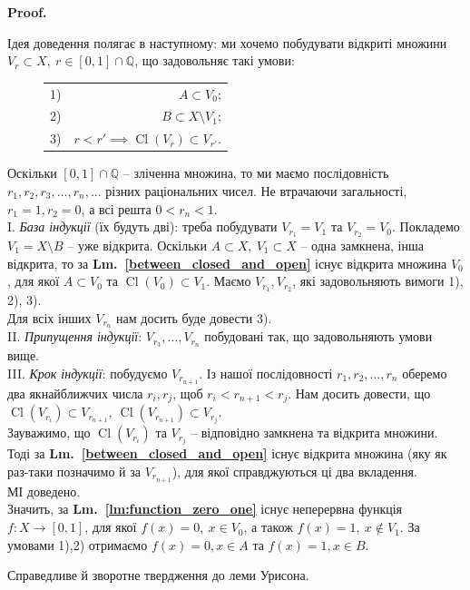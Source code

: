 \documentclass[a4paper, 10pt]{article}
\makeatletter
\theoremstyle{theoremdd}
\newcommand\lmref[1]{\textbf{Lm.~\ref{#1}}}
\DeclareMathOperator{\Cl}{Cl}
\renewenvironment{proof}[1][Proof.\\]{\par
\pushQED{\hfill \qed}%
\normalfont \topsep6\p@\@plus6\p@\relax
\trivlist
\item\relax
{\bfseries
#1\@addpunct{.}}\hspace\labelsep\ignorespaces
}{%
\popQED\endtrivlist\@endpefalse
}
\makeatother
\begin{document}
\begin{proof}
Ідея доведення полягає в наступному: ми хочемо побудувати відкриті множини $V_r \subset X,\ r \in [0,1] \cap \mathbb{Q}$, що задовольняє такі умови:
\begin{figure}[H]
\centering
\begin{tabular}{lr}
1) & $A \subset V_0$; \\
2) & $B \subset X \setminus V_1$; \\
3) & $r < r' \implies \Cl(V_r) \subset V_{r'}$.
\end{tabular}
\end{figure}
\noindent
Оскільки $[0,1] \cap \mathbb{Q}$ -- зліченна множина, то ми маємо послідовність $r_1,r_2,r_3,\dots,r_n,\dots$ різних раціональних чисел. Не втрачаючи загальності, $r_1 = 1, r_2 = 0$, а всі решта $0 < r_n < 1$.
\bigskip \\
I. \textit{База індукції} (їх будуть дві): треба побудувати $V_{r_1} = V_1$ та $V_{r_2} = V_0$. Покладемо $V_1 = X \setminus B$ -- уже відкрита. Оскільки $A \subset X,\ V_1 \subset X$ -- одна замкнена, інша відкрита, то за \lmref{between_closed_and_open} існує відкрита множина $V_0$, для якої $A \subset V_0$ та $\Cl(V_0) \subset V_1$. Маємо $V_{r_1},V_{r_2}$, які задовольняють вимоги 1), 2), 3).\\
Для всіх інших $V_{r_n}$ нам досить буде довести 3).\\
II. \textit{Припущення індукції}: $V_{r_3},\dots,V_{r_n}$ побудовані так, що задовольняють умови вище.\\
III. \textit{Крок індукції}: побудуємо $V_{r_{n+1}}$. Із нашої послідовності $r_1,r_2,\dots,r_n$ оберемо два якнайближчих числа $r_i,r_j$, щоб $r_i < r_{n+1} < r_j$. Нам досить довести, що $\Cl(V_{r_i}) \subset V_{r_{n+1}},\ \Cl(V_{r_{n+1}}) \subset V_{r_j}$.\\
Зауважимо, що $\Cl(V_{r_i})$ та $V_{r_j}$ -- відповідно замкнена та відкрита множини. Тоді за \lmref{between_closed_and_open} існує відкрита множина (яку як раз-таки позначимо й за $V_{r_{n+1}}$), для якої справджуються ці два вкладення. \\
МІ доведено.\\
Значить, за \lmref{lm:function_zero_one} існує неперервна функція $f \colon X \to [0,1]$, для якої $f(x) = 0,\ x \in V_0$, а також $f(x) = 1,\ x \notin V_1$. За умовами 1),2) отримаємо $f(x) = 0, x \in A$ та $f(x) = 1, x \in B$.
\end{proof}

\noindent
Справедливе й зворотне твердження до леми Урисона.
\end{document}
